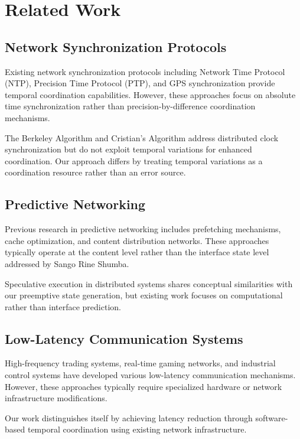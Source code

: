 \documentclass[12pt,a4paper]{article}
\begin{document}
\section{Related Work}

\subsection{Network Synchronization Protocols}

Existing network synchronization protocols including Network Time Protocol (NTP), Precision Time Protocol (PTP), and GPS synchronization provide temporal coordination capabilities. However, these approaches focus on absolute time synchronization rather than precision-by-difference coordination mechanisms.

The Berkeley Algorithm and Cristian's Algorithm address distributed clock synchronization but do not exploit temporal variations for enhanced coordination. Our approach differs by treating temporal variations as a coordination resource rather than an error source.

\subsection{Predictive Networking}

Previous research in predictive networking includes prefetching mechanisms, cache optimization, and content distribution networks. These approaches typically operate at the content level rather than the interface state level addressed by Sango Rine Shumba.

Speculative execution in distributed systems shares conceptual similarities with our preemptive state generation, but existing work focuses on computational rather than interface prediction.

\subsection{Low-Latency Communication Systems}

High-frequency trading systems, real-time gaming networks, and industrial control systems have developed various low-latency communication mechanisms. However, these approaches typically require specialized hardware or network infrastructure modifications.

Our work distinguishes itself by achieving latency reduction through software-based temporal coordination using existing network infrastructure.
\end{document}

